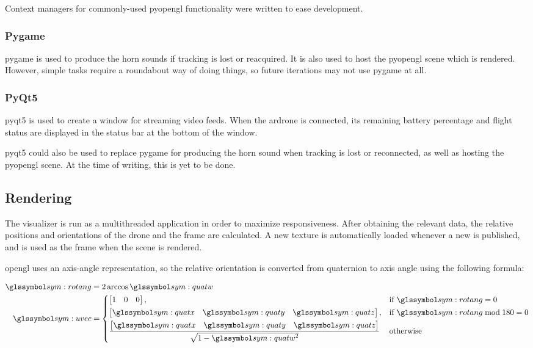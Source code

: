     Context managers for commonly-used \gls{pyopengl} functionality were written to ease development.
    
    \subsubsection{Pygame}
    \gls{pygame} is used to produce the horn sounds if tracking is lost or reacquired.
    It is also used to host the \gls{pyopengl} scene which is rendered.
    However, simple tasks require a roundabout way of doing things, so future iterations may not use \gls{pygame} at all.

    \subsubsection{PyQt5}
    \gls{pyqt5} is used to create a window for streaming video feeds.
    When the \gls{ardrone} is connected, its remaining battery percentage and flight status are displayed in the status bar at the bottom of the window.

    \gls{pyqt5} could also be used to replace \gls{pygame} for producing the horn sound when tracking is lost or reconnected, as well as hosting the \gls{pyopengl} scene.
    At the time of writing, this is yet to be done.

  \subsection{Rendering}
    The visualizer is run as a multithreaded application in order to maximize responsiveness.
    After obtaining the relevant data, the relative positions and orientations of the drone and the frame are calculated.
    A new texture is automatically loaded whenever a new \texttt{} is published, and is used as the frame when the scene is rendered.

    \gls{opengl} uses an axis-angle representation, so the relative orientation is converted from quaternion to axis angle using the following formula:

    \begin{align}
      \sym{rotang} &= 2\arccos\sym{quatw} \\
      \sym{uvec} &= 
      \begin{dcases}
	\begin{bmatrix}1 & 0 & 0\end{bmatrix},& \text{if } \sym{rotang} = 0 \\
	\begin{bmatrix}\sym{quatx} & \sym{quaty} & \sym{quatz}\end{bmatrix},& \text{if } \sym{rotang} \bmod 180 = 0 \\
      \frac{\begin{bmatrix}\sym{quatx} & \sym{quaty} & \sym{quatz}\end{bmatrix}}{\sqrt{1 - \sym{quatw}^2}} & \text{otherwise}
      \end{dcases}
    \end{align}

